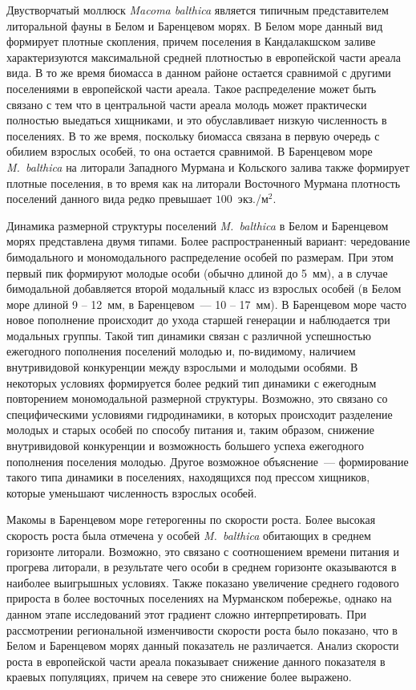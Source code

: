 Двустворчатый моллюск \textit{Macoma balthica} является типичным представителем литоральной фауны в Белом и Баренцевом морях. 
В Белом море данный вид формирует плотные скопления, причем поселения в Кандалакшском заливе характеризуются максимальной средней плотностью в европейской части ареала вида. 
В то же время биомасса в данном районе остается сравнимой с другими поселениями в европейской части ареала.
Такое распределение может быть связано с тем что в центральной части ареала молодь может практически полностью выедаться хищниками, и это обуславливает низкую численность в поселениях. 
В то же время, поскольку биомасса связана в первую очередь с обилием взрослых особей, то она остается сравнимой.
В Баренцевом море \textit{M.~balthica} на литорали Западного Мурмана и Кольского залива также формирует плотные поселения, в то время как на литорали Восточного Мурмана плотность поселений данного вида редко превышает $100$~экз./м$^2$.


Динамика размерной структуры поселений {\it M.~balthica} в Белом и Баренцевом морях представлена двумя типами.
Более распространенный вариант: чередование бимодального и мономодального распределение особей по размерам. 
При этом первый пик формируют молодые особи (обычно длиной до 5~мм), а в случае бимодальной добавляется второй модальный класс из взрослых особей (в Белом море длиной 9 -- 12~мм, в Баренцевом~--- 10 -- 17~мм). 
В Баренцевом море часто новое пополнение происходит до ухода старшей генерации и наблюдается три модальных группы. 
Такой тип динамики связан с различной успешностью ежегодного пополнения поселений молодью и, по-видимому, наличием внутривидовой конкуренции между взрослыми и молодыми особями.
В некоторых условиях формируется более редкий тип динамики с ежегодным повторением мономодальной размерной структуры. 
Возможно, это связано со специфическими условиями гидродинамики, в которых происходит разделение молодых и старых особей по способу питания и, таким образом, снижение внутривидовой конкуренции и возможность большего успеха ежегодного пополнения поселения молодью. 
Другое возможное объяснение~--- формирование такого типа динамики в поселениях, находящихся под прессом хищников, которые уменьшают численность взрослых особей.

Макомы в Баренцевом море гетерогенны по скорости роста. 
Более высокая скорость роста была отмечена у особей {\it M.~balthica} обитающих в среднем горизонте литорали.
Возможно, это связано с соотношением времени питания и прогрева литорали, в результате чего особи в среднем горизонте оказываются в наиболее выигрышных условиях.
Также показано увеличение среднего годового прироста в более восточных поселениях на Мурманском побережье, однако на данном этапе исследований этот градиент сложно интерпретировать.
При рассмотрении региональной изменчивости скорости роста было показано, что в Белом и Баренцевом морях данный показатель не различается.
Анализ скорости роста в европейской части ареала показывает снижение данного показателя в краевых популяциях, причем на севере это снижение более выражено.

